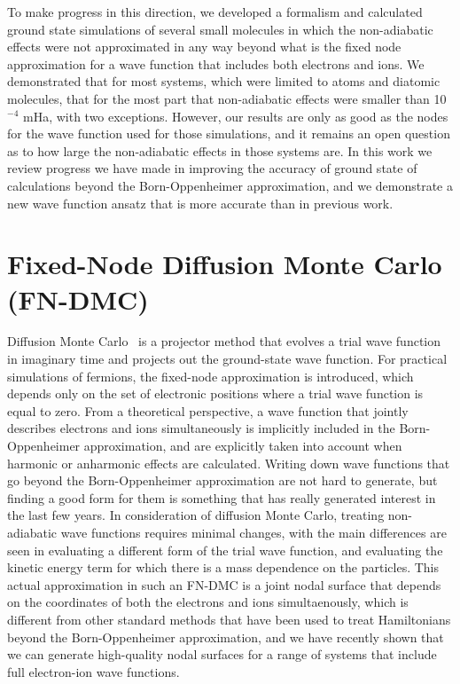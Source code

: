 \documentclass[aip,jcp,numerical,reprint]{revtex4-1}
\begin{document}
To make progress in this direction, we developed a formalism and calculated ground state simulations of several small molecules in which the non-adiabatic effects were not approximated in any way beyond what is the fixed node approximation for a wave function that includes both electrons and ions.  We demonstrated that for most systems, which were limited to atoms and diatomic molecules, that for the most part that non-adiabatic effects were smaller than 10$^{-4}$ mHa, with two exceptions.    However, our results are only as good as the nodes for the wave function used for those simulations, and it remains an open question as to how large the non-adiabatic effects in those systems are. 
In this work we review progress we have made in improving the accuracy of  ground state of calculations beyond the Born-Oppenheimer approximation, and we demonstrate a new wave function ansatz that is more accurate than in previous work.


\section{Fixed-Node Diffusion Monte Carlo (FN-DMC)}
Diffusion Monte Carlo~\cite{Anderson_DMC,lester1,Stuart_Review,Needs_Review,Needs_Old_Review,QMC_Review} is a projector method that evolves a trial wave function in imaginary time and projects out the ground-state wave function. For practical simulations of fermions, the fixed-node approximation is introduced, which depends only on the set of electronic positions where a trial wave function is equal to zero.  From a theoretical perspective, a wave function that jointly describes electrons and ions simultaneously is implicitly included in the Born-Oppenheimer approximation, and are explicitly taken into account when harmonic or anharmonic effects are calculated.  Writing down wave functions that go beyond the Born-Oppenheimer approximation are not hard to generate, but finding a good form for them is something that has really generated  interest in the last few years.  In consideration of diffusion Monte Carlo, treating non-adiabatic wave functions requires minimal changes, with the main differences are seen in evaluating a different form of the trial wave function, and  evaluating the kinetic energy term for which there is a mass dependence on the particles.  This actual approximation in such an FN-DMC is a joint nodal surface that depends on the coordinates of both the electrons and ions simultaenously, which is different from other standard methods that have been used to treat Hamiltonians beyond the Born-Oppenheimer approximation, and we have recently shown that we can generate high-quality nodal surfaces for a range of systems that include full electron-ion wave functions. 
\end{document}
